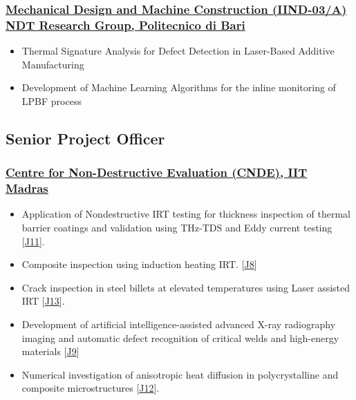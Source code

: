 \documentclass{my_cv}%
\begin{document}
\subsubsection{\href{https://www.dmmm.poliba.it/index.php/en/}{Mechanical Design and Machine Construction (IIND-03/A) NDT Research Group, Politecnico di Bari}}
\begin{itemize}[leftmargin=0.15in]
\setlength\itemsep{-0.1em}
\color{mygray}
\item Thermal Signature Analysis for Defect Detection in Laser-Based Additive Manufacturing
\item Development of Machine Learning Algorithms for the inline monitoring of LPBF process
\end{itemize}
{\color{mygray1} \hdashrule[0.1ex]{18.8cm}{0.2mm}{1mm}}
\subsection{Senior Project Officer}
\subsubsection{\href{https://www.cnde.in/}{Centre for Non-Destructive Evaluation (CNDE), IIT Madras}}
\begin{itemize}[leftmargin=0.15in]
\setlength\itemsep{-0.1em}
\color{mygray}
\item Application of Nondestructive IRT testing for thickness inspection of thermal barrier coatings and validation using THz-TDS and Eddy current testing [\textcolor{mypink}{\hyperref[J11]{J11}}].
\item Composite inspection using induction heating IRT. [\textcolor{mypink}{\hyperref[J8]{J8}}]
\item Crack inspection in steel billets at elevated temperatures using Laser assisted IRT [\textcolor{mypink}{\hyperref[J13]{J13}}].
\item Development of artificial intelligence-assisted advanced X-ray radiography imaging and automatic defect recognition of critical welds and high-energy materials [\textcolor{mypink}{\hyperref[J9]{J9}}]
\item Numerical investigation of anisotropic heat diffusion in polycrystalline and composite microstructures [\textcolor{mypink}{\hyperref[J12]{J12}}].
\end{itemize}%
{\color{mygray1} \hdashrule[0.1ex]{18.8cm}{0.2mm}{1mm}}
\end{document}

